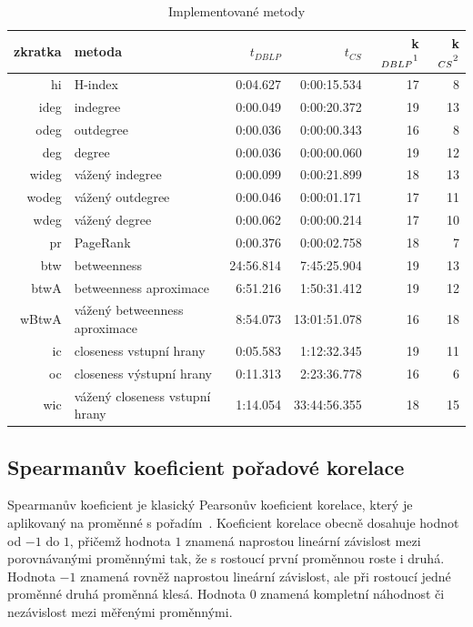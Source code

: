 \documentclass{bakalarka}
\begin{document}
\begin{table}[!ht]
\centering
\caption{Implementované metody}
\label{tab:impmetody}
\begin{small}
\begin{tabular}{r|l|r|r|r|r}
\toprule
zkratka & metoda & $t_{DBLP}$ & $t_{CS}$ & k$_{DBLP}\footnotemark[1]$ & k$_{CS}\footnotemark[2]$ \\
\midrule
hi   &H-index                           & 0:04.627& 0:00:15.534&17&8\\
ideg &indegree                          & 0:00.049& 0:00:20.372&19&13\\
odeg &outdegree                         & 0:00.036& 0:00:00.343&16&8\\
deg  &degree                            & 0:00.036& 0:00:00.060&19&12\\
wideg&vážený indegree                   & 0:00.099& 0:00:21.899&18&13\\
wodeg&vážený outdegree                  & 0:00.046& 0:00:01.171&17&11\\
wdeg &vážený degree                     & 0:00.062& 0:00:00.214&17&10\\
pr   &PageRank                          & 0:00.376& 0:00:02.758&18&7\\
btw  &betweenness                       &24:56.814& 7:45:25.904&19&13\\
btwA &betweenness aproximace            & 6:51.216& 1:50:31.412&19&12\\
wBtwA&vážený betweenness aproximace     & 8:54.073&13:01:51.078&16&18\\
\midrule
ic   &closeness vstupní hrany           & 0:05.583& 1:12:32.345&19&11\\
oc   &closeness výstupní hrany          & 0:11.313& 2:23:36.778&16&6\\
wic  &vážený closeness vstupní hrany    & 1:14.054&33:44:56.355&18&15\\
\bottomrule
\end{tabular}
\end{small}
\end{table}


\subsection{Spearmanův koeficient pořadové korelace}
\label{sec:spearman}
Spearmanův koeficient je klasický Pearsonův koeficient korelace, který je
aplikovaný na proměnné s pořadím~\citep{myerswell2002}. Koeficient korelace
obecně dosahuje hodnot od $-1$ do $1$, přičemž hodnota $1$ znamená naprostou
lineární závislost mezi porovnávanými proměnnými tak, že s rostoucí první
proměnnou roste i druhá. Hodnota $-1$ znamená rovněž naprostou lineární
závislost, ale při rostoucí jedné proměnné druhá proměnná klesá. Hodnota $0$
znamená kompletní náhodnost či nezávislost mezi měřenými proměnnými.
\end{document}
